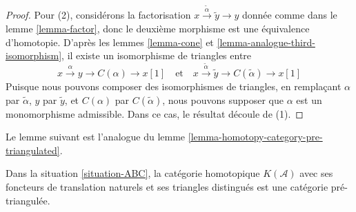 \begin{proof}
\medskip\noindent
Pour (2), considérons la factorisation
$x\xrightarrow{\tilde{\alpha}}\tilde{y}\to y$
donnée comme dans le lemme \ref{lemma-factor}, donc le deuxième
morphisme est une équivalence d'homotopie. D'après les lemmes
\ref{lemma-cone} et \ref{lemma-analogue-third-isomorphism},
il existe un isomorphisme de triangles entre
$$
x \xrightarrow{\alpha} y \to C(\alpha) \to x[1]
\quad\text{et}\quad
x \xrightarrow{\tilde{\alpha}} \tilde{y} \to C(\tilde{\alpha}) \to x[1]
$$
Puisque nous pouvons composer des isomorphismes de triangles, en
remplaçant $\alpha$ par $\tilde{\alpha}$, $y$ par $\tilde{y}$, et $C(\alpha)$
par $C(\tilde{\alpha})$, nous pouvons supposer que $\alpha$ est un monomorphisme
admissible. Dans ce cas, le résultat découle de (1).
\end{proof}

\noindent
Le lemme suivant est l'analogue du
lemme \ref{lemma-homotopy-category-pre-triangulated}.

\begin{lemma}
\label{lemma-analogue-homotopy-category-pre-triangulated}
Dans la situation \ref{situation-ABC}, la catégorie homotopique
$K(\mathcal{A})$ avec ses foncteurs de translation naturels et ses triangles distingués
est une catégorie pré-triangulée.
\end{lemma}

